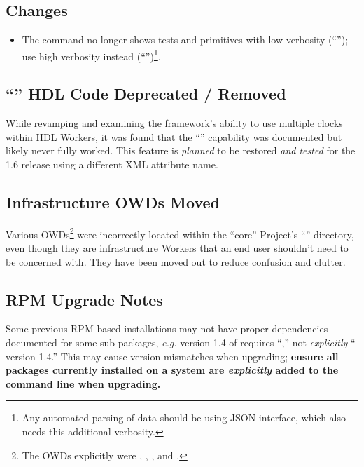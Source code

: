 \subsection{\ocpidev Changes}
\label{sec:15_ocpidev_changes}
\begin{itemize}
\setlength\itemsep{0em} %
\item The  command no longer shows tests and primitives with low verbosity (``''); use high verbosity instead (``'')\footnote{Any automated parsing of data should be using JSON interface, which also needs this additional verbosity.}. %
\end{itemize}
\subsection{``'' HDL Code Deprecated / Removed} %
\label{sec:15_myclock}
While revamping and examining the framework's ability to use multiple clocks within HDL Workers, it was found that the ``'' capability was documented but likely never fully worked. This feature is \textit{planned} to be restored \textit{and tested} for the 1.6 release using a different XML attribute name.
\subsection{Infrastructure OWDs Moved} %
Various OWDs\footnote{The OWDs explicitly were , , , and .} were incorrectly located within the ``core'' Project's ``'' directory, even though they are infra\-structure Workers that an end user shouldn't need to be concerned with. They have been moved out to reduce confusion and clutter.
\subsection{RPM Upgrade Notes} %
Some previous RPM-based installations may not have proper dependencies documented for some sub-packages, \textit{e.g.} version 1.4 of  requires ``,'' not \textit{explicitly} `` version 1.4.'' This may cause version mismatches when upgrading; \textbf{ensure all packages currently installed on a system are \textit{explicitly} added to the  command line when upgrading.}

